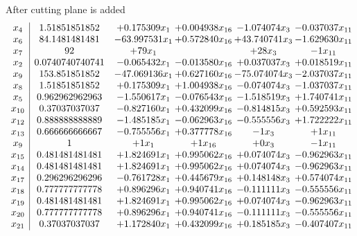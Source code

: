 \documentclass[11pt]{article}
\begin{document}
 After cutting plane is added 
\[\begin{array}{c| c c@{\hskip 2pt} c@{\hskip 2pt} c@{\hskip 2pt} c@{\hskip 2pt} }
 x_{4}   &  1.51851851852 & + 0.175309 x_{1} & + 0.004938 x_{16} & -1.074074 x_{3} & -0.037037 x_{11}\\
 x_{6}   &  84.1481481481 & -63.997531 x_{1} & + 0.572840 x_{16} & + 43.740741 x_{3} & -1.629630 x_{11}\\
 x_{7}   &  92 & + 79 x_{1} &   & + 28 x_{3} & -1 x_{11}\\
 x_{2}   &  0.0740740740741 & -0.065432 x_{1} & -0.013580 x_{16} & + 0.037037 x_{3} & + 0.018519 x_{11}\\
 x_{9}   &  153.851851852 & -47.069136 x_{1} & + 0.627160 x_{16} & -75.074074 x_{3} & -2.037037 x_{11}\\
 x_{8}   &  1.51851851852 & + 0.175309 x_{1} & + 1.004938 x_{16} & -0.074074 x_{3} & -1.037037 x_{11}\\
 x_{5}   &  0.962962962963 & -1.550617 x_{1} & -0.076543 x_{16} & -1.518519 x_{3} & + 1.740741 x_{11}\\
 x_{10}   &  0.37037037037 & -0.827160 x_{1} & + 0.432099 x_{16} & -0.814815 x_{3} & + 0.592593 x_{11}\\
 x_{12}   &  0.888888888889 & -1.485185 x_{1} & -0.062963 x_{16} & -0.555556 x_{3} & + 1.722222 x_{11}\\
 x_{13}   &  0.666666666667 & -0.755556 x_{1} & + 0.377778 x_{16} & -1 x_{3} & + 1 x_{11}\\
 x_{9}   &  1 & + 1 x_{1} & + 1 x_{16} & + 0 x_{3} & -1 x_{11}\\
 x_{15}   &  0.481481481481 & + 1.824691 x_{1} & + 0.995062 x_{16} & + 0.074074 x_{3} & -0.962963 x_{11}\\
 x_{14}   &  0.481481481481 & + 1.824691 x_{1} & + 0.995062 x_{16} & + 0.074074 x_{3} & -0.962963 x_{11}\\
 x_{17}   &  0.296296296296 & -0.761728 x_{1} & + 0.445679 x_{16} & + 0.148148 x_{3} & + 0.574074 x_{11}\\
 x_{18}   &  0.777777777778 & + 0.896296 x_{1} & + 0.940741 x_{16} & -0.111111 x_{3} & -0.555556 x_{11}\\
 x_{19}   &  0.481481481481 & + 1.824691 x_{1} & + 0.995062 x_{16} & + 0.074074 x_{3} & -0.962963 x_{11}\\
 x_{20}   &  0.777777777778 & + 0.896296 x_{1} & + 0.940741 x_{16} & -0.111111 x_{3} & -0.555556 x_{11}\\
 x_{21}   &  0.37037037037 & + 1.172840 x_{1} & + 0.432099 x_{16} & + 0.185185 x_{3} & -0.407407 x_{11}\\

\end{array}\]
\end{document}
